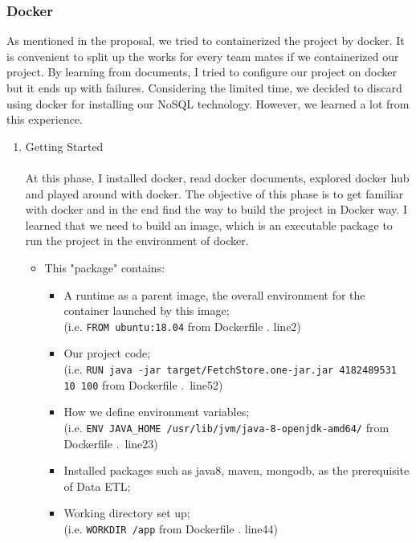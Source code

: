 \documentclass{article}
\newcommand{\codeinline}[1]{
    \texttt{#1}
}
\begin{document}
\subsubsection{Docker}

As mentioned in the proposal, we tried to containerized the project by docker. It is convenient to split up the works for every team mates if we containerized our project. By learning from documents, I tried to configure our project on docker but it ends up with failures. Considering the limited time, we decided to discard using docker for installing our NoSQL technology. However, we learned a lot from this experience.

\begin{enumerate}
    \item Getting Started\\\\
    At this phase, I installed docker, read docker documents, explored docker hub and played around with docker. The objective of this phase is to get familiar with docker and in the end find the way to build the project in Docker way. I learned that we need to build an image, which is an executable package to run the project in the environment of docker.
    \begin{itemize}
        \item This "package" contains:
        \begin{itemize}
            \item A runtime as a parent image, the overall environment for the container launched by this image;\\(i.e.\codeinline{FROM ubuntu:18.04} from Dockerfile . line2)
            \item Our project code;\\ (i.e.\codeinline{RUN java -jar target/FetchStore.one-jar.jar 4182489531 10 100} from Dockerfile .\ line52)
            \item How we define environment variables;\\ (i.e. \codeinline{ENV JAVA_HOME /usr/lib/jvm/java-8-openjdk-amd64/} from Dockerfile .\ line23)
            \item Installed packages such as java8, maven, mongodb, as the prerequisite of Data ETL;
            \item Working directory set up;\\(i.e.\codeinline{WORKDIR /app} from Dockerfile . line44)
        \end{itemize}
    \end{itemize}


\end{enumerate}
\end{document}
